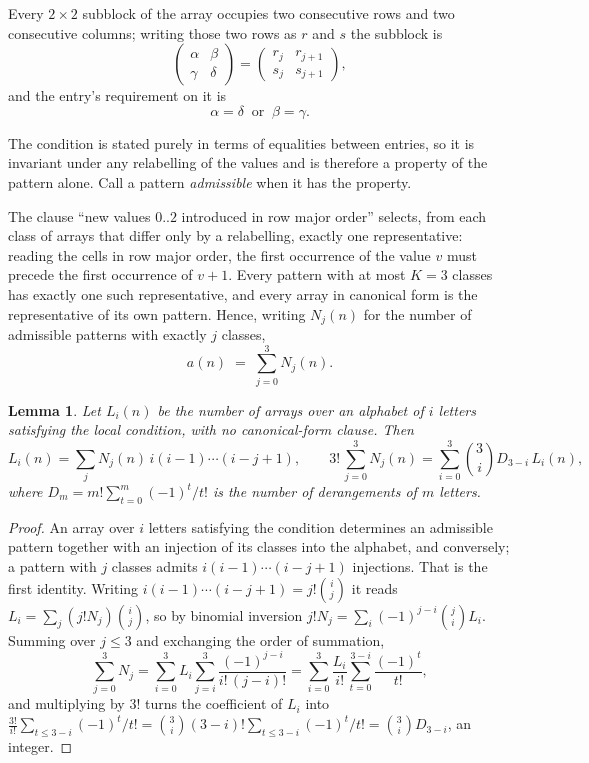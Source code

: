 \documentclass[11pt,a4paper]{article}
\theoremstyle{plain}
\newtheorem{lemma}[theorem]{Lemma}
\theoremstyle{definition}
\begin{document}
Every $2\times2$ subblock of the array occupies two consecutive
rows and two consecutive columns; writing those two rows as $r$ and $s$ the
subblock is
\[
\begin{pmatrix}\alpha&\beta\\\gamma&\delta\end{pmatrix}=\begin{pmatrix}r_j&r_{j+1}\\s_j&s_{j+1}\end{pmatrix},
\]
and the entry's requirement on it is
\begin{equation}\label{eq:loc}
\alpha=\delta\ \text{ or }\ \beta=\gamma.
\end{equation}

The condition is stated purely in terms of equalities between entries, so it is invariant
under any relabelling of the values and is therefore a property of the pattern alone. Call a
pattern \emph{admissible} when it has the property.

The clause ``new values $0..2$ introduced in row major order'' selects, from each class
of arrays that differ only by a relabelling, exactly one representative: reading the cells in
row major order, the first occurrence of the value $v$ must precede the first occurrence of
$v+1$. Every pattern with at most $K=3$ classes has exactly one such representative, and
every array in canonical form is the representative of its own pattern. Hence, writing
$N_j(n)$ for the number of admissible patterns with exactly $j$ classes,
\begin{equation}\label{eq:apat}
a(n)\;=\;\sum_{j=0}^{3}N_j(n).
\end{equation}

\begin{lemma}\label{lem:inv}
Let $L_i(n)$ be the number of arrays over an alphabet of $i$ letters satisfying the local
condition, with no canonical-form clause. Then
\[
L_i(n)=\sum_j N_j(n)\,i(i-1)\cdots(i-j+1),
\qquad
3!\,\sum_{j=0}^{3}N_j(n)=\sum_{i=0}^{3}\binom{3}{i}D_{3-i}\,L_i(n),
\]
where $D_m=m!\sum_{t=0}^{m}(-1)^t/t!$ is the number of derangements of $m$ letters.
\end{lemma}

\begin{proof}
An array over $i$ letters satisfying the condition determines an admissible pattern together
with an injection of its classes into the alphabet, and conversely; a pattern with $j$
classes admits $i(i-1)\cdots(i-j+1)$ injections. That is the first identity. Writing
$i(i-1)\cdots(i-j+1)=j!\binom{i}{j}$ it reads $L_i=\sum_j (j!N_j)\binom{i}{j}$, so by
binomial inversion $j!N_j=\sum_{i}(-1)^{j-i}\binom{j}{i}L_i$. Summing over
$j\le 3$ and exchanging the order of summation,
\[
\sum_{j=0}^{3}N_j=\sum_{i=0}^{3}L_i\sum_{j=i}^{3}\frac{(-1)^{j-i}}{i!\,(j-i)!}
=\sum_{i=0}^{3}\frac{L_i}{i!}\sum_{t=0}^{3-i}\frac{(-1)^t}{t!} ,
\]
and multiplying by $3!$ turns the coefficient of $L_i$ into
$\frac{3!}{i!}\sum_{t\le 3-i}(-1)^t/t!=\binom{3}{i}(3-i)!\sum_{t\le 3-i}(-1)^t/t!
=\binom{3}{i}D_{3-i}$, an integer.
\end{proof}
\end{document}
